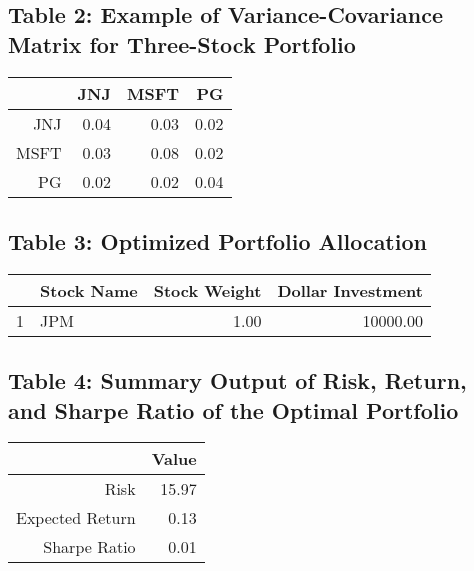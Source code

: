 \documentclass[12pt,english]{article}
\begin{document}
        \subsection{Table 2: Example of Variance-Covariance Matrix for Three-Stock Portfolio} 
                \begin{table}[ht]
                \centering
                \begin{tabular}{rrrr}
                \hline
                 & JNJ & MSFT & PG \\ 
                \hline
                JNJ & 0.04 & 0.03 & 0.02 \\ 
                  MSFT & 0.03 & 0.08 & 0.02 \\ 
                  PG & 0.02 & 0.02 & 0.04 \\ 
                \hline
                \end{tabular}
                \end{table}
        
        \subsection{Table 3: Optimized Portfolio Allocation}
                \begin{table}[ht]
                \centering
                \begin{tabular}{rlrr}
                  \hline
                 & Stock Name & Stock Weight & Dollar Investment \\ 
                  \hline
                1 & JPM & 1.00 & 10000.00 \\ 
                   \hline
                \end{tabular}
                \end{table}
                
        \subsection{Table 4: Summary Output of Risk, Return, and Sharpe Ratio of the Optimal Portfolio}
                \begin{table}[ht]
                \centering
                \begin{tabular}{rr}
                  \hline
                 & Value \\ 
                  \hline
                Risk & 15.97 \\ 
                  Expected Return & 0.13 \\ 
                  Sharpe Ratio & 0.01 \\ 
                   \hline
                \end{tabular}
                \end{table}
    
\end{document}
